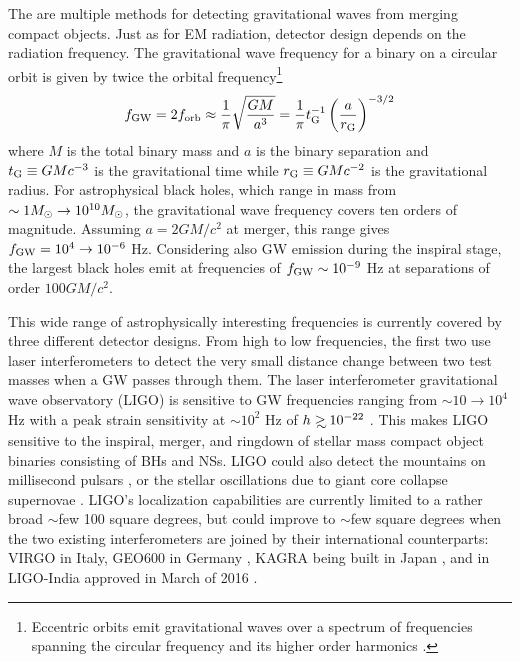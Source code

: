 The are multiple methods for detecting gravitational waves from merging
compact objects. Just as for EM radiation, detector design depends on the
radiation frequency. The gravitational wave frequency for a binary on a
circular orbit is given by twice the orbital frequency\footnote{Eccentric
orbits emit gravitational waves over a spectrum of frequencies spanning the
circular frequency and its higher order harmonics \citep[\textit{e.g.}][]{Enoki:2007}.} 
\begin{equation}
f_{\rm{GW}} = 2 f_{\rm{orb}} \approx  \frac{1}{\pi} \sqrt{\frac{G M }{a^3}} =
\frac{1}{\pi} t^{-1}_{\rm{G}} \left( \frac{a}{r_{\rm{G}}} \right)^{-3/2}
\label{Eq:GWfreq}
\end{equation} 
where $M$ is the total binary mass and $a$ is the binary
separation and $t_{\rm{G}} \equiv GMc^{-3}$ is the gravitational time while
$r_{\rm{G}} \equiv GMc^{-2}$ is the gravitational radius.  For astrophysical
black holes, which range in mass from $\sim 1 {M_{\odot}} \rightarrow 10^{10}
{M_{\odot}}$, the gravitational wave frequency covers ten orders of magnitude.
Assuming $a = 2GM/c^2$ at merger, this range gives $f_{\rm{GW}} = 10^4 \rightarrow
10^{-6}$ Hz. Considering also GW emission during the inspiral stage, the
largest black holes emit at frequencies of $f_{\rm{GW}} \sim 10^{-9}$ Hz at
separations of order $100 GM/c^2$.

This wide range of astrophysically interesting frequencies is currently
covered by three different detector designs. From high to low frequencies, the
first two use laser interferometers to detect the very small distance change
between two test masses when a GW passes through them. The laser
interferometer gravitational wave observatory (LIGO) is sensitive to GW
frequencies ranging from $\sim 10 \rightarrow 10^4$ Hz with a peak strain
sensitivity at $\sim10^{2}$ Hz of $h \gsim 10^{-22}$ \citep{aLIGO:2015}. This
makes LIGO sensitive to the inspiral, merger, and ringdown of stellar mass
compact object binaries consisting of BHs and NSs. 
%
%
LIGO could also detect the mountains on millisecond pulsars 
\citep[\textit{e.g.}][and references therein]{ContWaveLIGO:2016}, 
or the stellar oscillations due to giant core
collapse supernovae \citep[\textit{e.g.}][and references
therein]{SNLIGO:2016}. LIGO's localization capabilities are currently limited
to a rather broad $\sim$few 100 square degrees, but could improve to $\sim$few
square degrees \citep{LIGO_Loc:2016} when the two existing interferometers are
joined by their international counterparts: VIRGO \citep{Acernese:2015} in
Italy, GEO600 in Germany \citep{Dooley:2015}, KAGRA being built in Japan
\citep{Tomaru:2016}, and in LIGO-India approved in March of 2016
\citep{LIGOIndia}.

